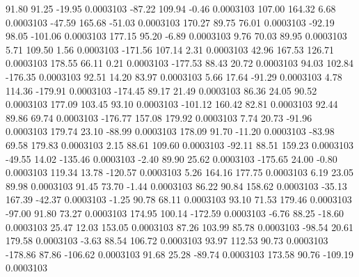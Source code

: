        91.80       91.25      -19.95     0.0003103
      -87.22      109.94       -0.46     0.0003103
      107.00      164.32        6.68     0.0003103
      -47.59      165.68      -51.03     0.0003103
      170.27       89.75       76.01     0.0003103
      -92.19       98.05     -101.06     0.0003103
      177.15       95.20       -6.89     0.0003103
        9.76       70.03       89.95     0.0003103
        5.71      109.50        1.56     0.0003103
     -171.56      107.14        2.31     0.0003103
       42.96      167.53      126.71     0.0003103
      178.55       66.11        0.21     0.0003103
     -177.53       88.43       20.72     0.0003103
       94.03      102.84     -176.35     0.0003103
       92.51       14.20       83.97     0.0003103
        5.66       17.64      -91.29     0.0003103
        4.78      114.36     -179.91     0.0003103
     -174.45       89.17       21.49     0.0003103
       86.36       24.05       90.52     0.0003103
      177.09      103.45       93.10     0.0003103
     -101.12      160.42       82.81     0.0003103
       92.44       89.86       69.74     0.0003103
     -176.77      157.08      179.92     0.0003103
        7.74       20.73      -91.96     0.0003103
      179.74       23.10      -88.99     0.0003103
      178.09       91.70      -11.20     0.0003103
      -83.98       69.58      179.83     0.0003103
        2.15       88.61      109.60     0.0003103
      -92.11       88.51      159.23     0.0003103
      -49.55       14.02     -135.46     0.0003103
       -2.40       89.90       25.62     0.0003103
     -175.65       24.00       -0.80     0.0003103
      119.34       13.78     -120.57     0.0003103
        5.26      164.16      177.75     0.0003103
        6.19       23.05       89.98     0.0003103
       91.45       73.70       -1.44     0.0003103
       86.22       90.84      158.62     0.0003103
      -35.13      167.39      -42.37     0.0003103
       -1.25       90.78       68.11     0.0003103
       93.10       71.53      179.46     0.0003103
      -97.00       91.80       73.27     0.0003103
      174.95      100.14     -172.59     0.0003103
       -6.76       88.25      -18.60     0.0003103
       25.47       12.03      153.05     0.0003103
       87.26      103.99       85.78     0.0003103
      -98.54       20.61      179.58     0.0003103
       -3.63       88.54      106.72     0.0003103
       93.97      112.53       90.73     0.0003103
     -178.86       87.86     -106.62     0.0003103
       91.68       25.28      -89.74     0.0003103
      173.58       90.76     -109.19     0.0003103
